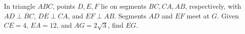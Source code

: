 In triangle $ABC$, points $D,E,F$ lie on segments $BC,CA,AB$, respectively, with $AD\perp BC$, $DE\perp CA$, and $EF\perp AB$. Segments $AD$ and $EF$ meet at $G$. Given $CE=4$, $EA=12$, and $AG=2\sqrt3$, find $EG$.
